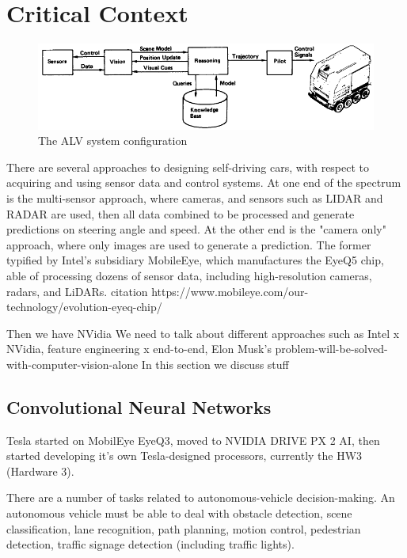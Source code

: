 \section{Critical Context}

\begin{figure}[h]
 \centering 
 \includegraphics[width=\columnwidth]{figures/ALV-system-configuration.png}
 \caption{The ALV system configuration}
 \label{fig:alv_system_configuration}
\end{figure}

There are several approaches to designing self-driving cars, with respect to acquiring and using sensor data and control systems. At one end of the spectrum is the multi-sensor approach, where cameras, and sensors such as LIDAR and RADAR are used, then all data combined to be processed and generate predictions on steering angle and speed. At the other end is the "camera only" approach, where only images are used to generate a prediction. The former typified by Intel's subsidiary MobileEye, which manufactures the EyeQ5 chip, able of processing dozens of sensor data, including high-resolution cameras, radars, and LiDARs.
citation
https://www.mobileye.com/our-technology/evolution-eyeq-chip/

Then we have NVidia
We need to talk about different approaches such as Intel x NVidia, feature engineering x end-to-end, Elon Musk's problem-will-be-solved-with-computer-vision-alone
In this section we discuss stuff \lipsum[1]

\subsection{Convolutional Neural Networks}

Tesla started on MobilEye EyeQ3, moved to NVIDIA DRIVE PX 2 AI, then started developing it's own Tesla-designed processors, currently the HW3 (Hardware 3).

There are a number of tasks related to autonomous-vehicle decision-making. An autonomous vehicle must be able to deal with obstacle detection, scene classification, lane recognition, path planning, motion control, pedestrian detection, traffic signage detection (including traffic lights). 



